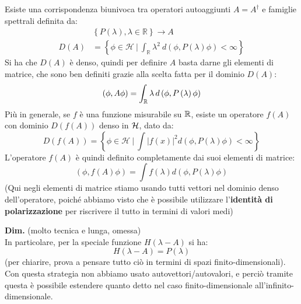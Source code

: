 \documentclass[../../FisicaTeorica.tex]{subfiles}
\begin{document}
\begin{thm}
Esiste una corrispondenza biunivoca tra operatori autoaggiunti $A=A^\dag$ e famiglie spettrali definita da:
\begin{align}
\nonumber &\left\{P\left(\lambda\right),\lambda\in\mathbb{R}\right\}\rightarrow A\\
D\left(A\right)&= \left\{\phi\in\mathcal{H}\ |\ \int_{\mathbb{R}}{\lambda^2\ d\left(\phi,P\left(\lambda\right)\phi\right)<\infty}\right\} 
\label{eqn:dominiofamigliaspettrale}
\end{align}
Si ha che $D(A)$ è denso, quindi per definire $A$ basta darne gli elementi di matrice, che sono ben definiti grazie alla scelta fatta per il dominio $D(A)$:
\[
\left(\phi,A\phi\right)=\int_{\mathbb{R}} \lambda\, d\left(\phi,P\left(\lambda\right)\phi\right)
\]
Più in generale, se $f$ è una funzione misurabile su $\mathbb{R}$, esiste un operatore $f\left(A\right)$ con dominio $D(f(A))$ denso in $\mathcal{H}$, dato da:
\[
D\left(f\left(A\right)\right)= \left\{\phi\in\mathcal{H}\ |\ \int\left|f\left(x\right)\right|^2d\left(\phi,P\left(\lambda\right)\phi\right)<\infty\right\}
\]
L'operatore $f(A)$ è quindi definito completamente dai suoi elementi di matrice:
\[
\left(\phi,f\left(A\right)\phi\right)=\int f\left(\lambda\right) d(\phi , P\left(\lambda\right)\phi )
\]
(Qui negli elementi di matrice stiamo usando tutti vettori nel dominio denso dell'operatore, poiché abbiamo visto che è possibile utilizzare l'\textbf{identità di polarizzazione} per riscrivere il tutto in termini di valori medi)
\end{thm}
\textbf{Dim.} (molto tecnica e lunga, omessa)\\
In particolare, per la speciale funzione $H(\lambda-A)$ si ha:
\[
H(\lambda-A) = P(\lambda)
\]
(per chiarire, prova a pensare tutto ciò in termini di spazi finito-dimensionali).\\
Con questa strategia non abbiamo usato autovettori/autovalori, e perciò tramite questa è possibile estendere quanto detto nel caso finito-dimensionale all'infinito-dimensionale.
\end{document}
